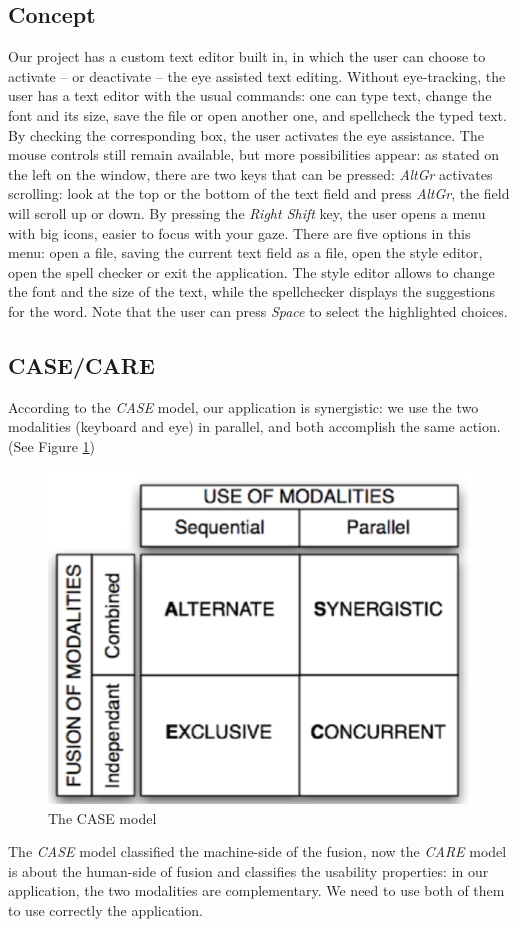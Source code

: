 \documentclass[12pt, a4paper, twoside]{article}
\begin{document}
\subsection{Concept}
Our project has a custom text editor built in, in which the user can choose to activate -- or deactivate -- the eye assisted text editing. Without eye-tracking, the user has a text editor with the usual commands: one can type text, change the font and its size, save the file or open another one, and spellcheck the typed text. By checking the corresponding box, the user activates the eye assistance. The mouse controls still remain available, but more possibilities appear: as stated on the left on the window, there are two keys that can be pressed: \textit{AltGr} activates scrolling: look at the top or the bottom of the text field and press \textit{AltGr}, the field will scroll up or down. By pressing the \textit{Right Shift} key, the user opens a menu with big icons, easier to focus with your gaze. There are five options in this menu: open a file, saving the current text field as a file, open the style editor, open the spell checker or exit the application. The style editor allows to change the font and the size of the text, while the spellchecker displays the suggestions for the word. Note that the user can press \textit{Space} to select the highlighted choices.  

\subsection{CASE/CARE}
According to the \textit{CASE} model, our application is synergistic: we use the two modalities (keyboard and eye) in parallel, and both accomplish the same action. (See Figure \ref{case-model})
\begin{figure}\centering
\includegraphics[scale=0.9]{casecare}
\caption{The CASE model}
\label{case-model}
\end{figure}
\newline
The \textit{CASE} model classified the machine-side of the fusion, now the \textit{CARE} model is about the human-side of fusion and classifies the usability properties: in our application, the two modalities are complementary. We need to use both of them to use correctly the application. 
\end{document}
